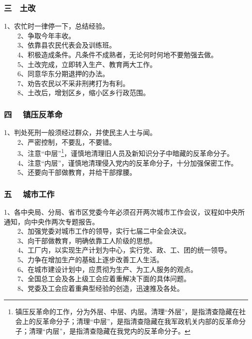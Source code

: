 \documentclass[cn,11pt,chinese]{elegantbook}
\def\myformat#1{\hfil\hfil #1}
\begin{document}
\subsubsection*{\myformat{三　土改}}
1、农忙时一律停一下，总结经验。\\
　　2、争取今年丰收。\\
　　3、依靠县农民代表会及训练班。\\
　　4、积极造成条件。凡条件不成熟者，无论何时何地不要勉强去做。\\
　　5、土改完成，立即转入生产、教育两大工作。\\
　　6、同意华东分期退押的办法。\\
　　7、劝告农民以不采非刑拷打为有利。\\
　　8、土改后，增划区乡，缩小区乡行政范围。\\
\subsubsection*{\myformat{四 　镇压反革命}}
1、判处死刑一般须经过群众，并使民主人士与闻。\\
　　2、严密控制，不要乱，不要错。\\
　　3、注意“中层”\footnote[1]{镇压反革命的工作，分为外层、中层、内层。清理“外层”，是指清查隐藏在社会上的反革命分子；清理“中层”，是指清查隐藏在我军政机关内部的反革命分子；清理“内层”，是指清查隐藏在我党内的反革命分子。}，谨慎地清理旧人员及新知识分子中暗藏的反革命分子。\\
　　4、注意“内层”，谨慎地清理侵入党内的反革命分子，十分加强保密工作。\\
　　5、还要向干部做教育，并给干部撑腰。\\
\subsubsection*{\myformat{五 　城市工作}}
1、各中央局、分局、省市区党委今年必须召开两次城市工作会议，议程如中央所通知，向中央作两次专题报告。\\
　　2、加强党委对城市工作的领导，实行七届二中全会决议。\\
　　3、向干部做教育，明确依靠工人阶级的思想。\\
　　4、工厂内，以实现生产计划为中心，实行党、政、工、团的统一领导。\\
　　5、力争在增加生产的基础上逐步改善工人生活。\\
　　6、在城市建设计划中，应贯彻为生产、为工人服务的观点。\\
　　7、全国总工会及各上级工会应着重解决下面的具体问题。\\
　　8、党委及工会应着重典型经验的创造，迅速推及各处。\\
\end{document}
